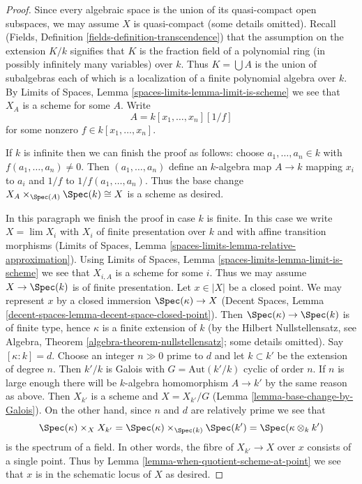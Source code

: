 \begin{proof}
Since every algebraic space is the union of its quasi-compact open
subspaces, we may assume $X$ is quasi-compact (some details omitted).
Recall (Fields, Definition \ref{fields-definition-transcendence})
that the assumption on the extension $K/k$ signifies that
$K$ is the fraction field of a polynomial ring (in possibly infinitely
many variables) over $k$. Thus $K = \bigcup A$ is the union of subalgebras
each of which is a localization of a finite polynomial algebra over $k$.
By Limits of Spaces, Lemma \ref{spaces-limits-lemma-limit-is-scheme}
we see that $X_A$ is a scheme for some $A$. Write
$$
A = k[x_1, \ldots, x_n][1/f]
$$
for some nonzero $f \in k[x_1, \ldots, x_n]$.

\medskip\noindent
If $k$ is infinite then we can finish the proof as follows: choose
$a_1, \ldots, a_n \in k$ with $f(a_1, \ldots, a_n) \not = 0$.
Then $(a_1, \ldots, a_n)$ define an $k$-algebra map $A \to k$
mapping $x_i$ to $a_i$ and $1/f$ to $1/f(a_1, \ldots, a_n)$.
Thus the base change $X_A \times_{\Spec(A)} \Spec(k) \cong X$ is a
scheme as desired.

\medskip\noindent
In this paragraph we finish the proof in case $k$ is finite. In this
case we write $X = \lim X_i$ with $X_i$ of finite presentation over $k$
and with affine transition morphisms
(Limits of Spaces, Lemma \ref{spaces-limits-lemma-relative-approximation}).
Using Limits of Spaces, Lemma \ref{spaces-limits-lemma-limit-is-scheme}
we see that $X_{i, A}$ is a scheme for some $i$. Thus we may assume
$X \to \Spec(k)$ is of finite presentation. Let $x \in |X|$ be a closed
point. We may represent $x$ by a closed immersion
$\Spec(\kappa) \to X$
(Decent Spaces, Lemma \ref{decent-spaces-lemma-decent-space-closed-point}).
Then $\Spec(\kappa) \to \Spec(k)$ is of finite type, hence $\kappa$
is a finite extension of $k$ (by the Hilbert Nullstellensatz, see
Algebra, Theorem \ref{algebra-theorem-nullstellensatz};
some details omitted). Say $[\kappa : k] = d$. Choose an integer
$n \gg 0$ prime to $d$ and let $k \subset k'$ be the extension
of degree $n$. Then $k'/k$ is Galois with $G = \text{Aut}(k'/k)$
cyclic of order $n$. If $n$ is large enough there will be $k$-algebra
homomorphism $A \to k'$ by the same reason as above.
Then $X_{k'}$ is a scheme and $X = X_{k'}/G$
(Lemma \ref{lemma-base-change-by-Galois}).
On the other hand, since $n$ and $d$ are relatively prime we see that
$$
\Spec(\kappa) \times_{X} X_{k'} =
\Spec(\kappa) \times_{\Spec(k)} \Spec(k') =
\Spec(\kappa \otimes_k k')
$$
is the spectrum of a field. In other words, the fibre of $X_{k'} \to X$
over $x$ consists of a single point. Thus by
Lemma \ref{lemma-when-quotient-scheme-at-point}
we see that $x$ is in the schematic locus of $X$ as desired.
\end{proof}

